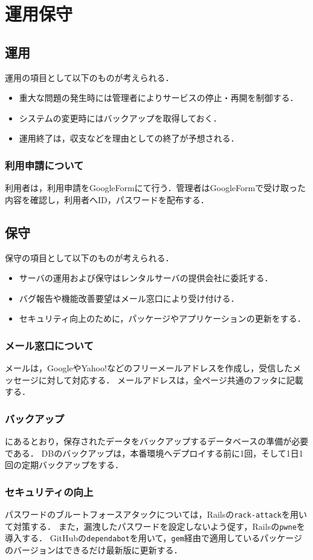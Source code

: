 \chapter{運用保守}
\section{運用}
運用の項目として以下のものが考えられる．
\begin{itemize}
    \item 重大な問題の発生時には管理者によりサービスの停止・再開を制御する．
    \item システムの変更時にはバックアップを取得しておく．
    \item 運用終了は，収支などを理由としての終了が予想される．
\end{itemize}
\subsection{利用申請について}
利用者は，利用申請をGoogleFormにて行う．管理者はGoogleFormで受け取った内容を確認し，利用者へID，パスワードを配布する．
\section{保守}
保守の項目として以下のものが考えられる．
\begin{itemize}
    \item サーバの運用および保守はレンタルサーバの提供会社に委託する．
    \item バグ報告や機能改善要望はメール窓口により受け付ける．
    \item セキュリティ向上のために，パッケージやアプリケーションの更新をする．
\end{itemize}
\subsection{メール窓口について}
メールは，GoogleやYahoo!などのフリーメールアドレスを作成し，受信したメッセージに対して対応する．
メールアドレスは，全ページ共通のフッタに記載する．
\subsection{バックアップ}
にあるとおり，保存されたデータをバックアップするデータベースの準備が必要である．
DBのバックアップは，本番環境へデプロイする前に1回，そして1日1回の定期バックアップをする．
\subsection{セキュリティの向上}
パスワードのブルートフォースアタックについては，Railsの\texttt{rack-attack}を用いて対策する．
また，漏洩したパスワードを設定しないよう促す，Railsの\texttt{pwne}を導入する．
GitHubの\texttt{dependabot}を用いて，\texttt{gem}経由で適用しているパッケージのバージョンはできるだけ最新版に更新する．